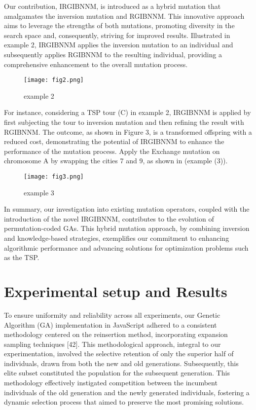 \documentclass[conference]{IEEEtran}
\begin{document}
Our contribution, IRGIBNNM, is introduced as a hybrid mutation that amalgamates the inversion mutation and RGIBNNM. This innovative approach aims to leverage the strengths of both mutations, promoting diversity in the search space and, consequently, striving for improved results. Illustrated in example 2, IRGIBNNM applies the inversion mutation to an individual and subsequently applies RGIBNNM to the resulting individual, providing a comprehensive enhancement to the overall mutation process.

\begin{figure}[t!]
\center
\texttt{[image: fig2.png]}
\caption{ example 2 }
\label{fig}
\end{figure}

For instance, considering a TSP tour (C) in example 2, IRGIBNNM is applied by first subjecting the tour to inversion mutation and then refining the result with RGIBNNM. The outcome, as shown in Figure 3, is a transformed offspring with a reduced cost, demonstrating the potential of IRGIBNNM to enhance the performance of the mutation process. Apply the Exchange mutation on chromosome A by swapping the cities 7
and 9, as shown in (example (3)).

\begin{figure}[t!]
\center
\texttt{[image: fig3.png]}
\caption{ example 3 }
\label{fig}
\end{figure}

In summary, our investigation into existing mutation operators, coupled with the introduction of the novel IRGIBNNM, contributes to the evolution of permutation-coded GAs. This hybrid mutation approach, by combining inversion and knowledge-based strategies, exemplifies our commitment to enhancing algorithmic performance and advancing solutions for optimization problems such as the TSP.


\section{Experimental setup and Results}
To ensure uniformity and reliability across all experiments, our Genetic Algorithm (GA) implementation in JavaScript adhered to a consistent methodology centered on the reinsertion method, incorporating expansion sampling techniques [42]. This methodological approach, integral to our experimentation, involved the selective retention of only the superior half of individuals, drawn from both the new and old generations. Subsequently, this elite subset constituted the population for the subsequent generation. This methodology effectively instigated competition between the incumbent individuals of the old generation and the newly generated individuals, fostering a dynamic selection process that aimed to preserve the most promising solutions.
\end{document}
